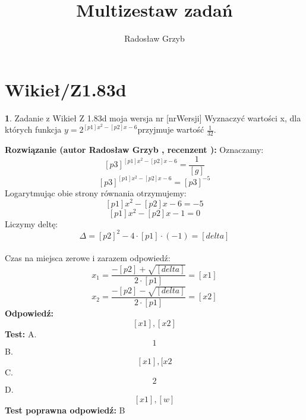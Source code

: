 \documentclass[12pt, a4paper]{article}
\title{Multizestaw zadań}
\author{Radosław Grzyb}
\date{}
\theoremstyle{definition} %
\newtheorem{zad}{}
\newcommand{\kategoria}[1]{\section{#1}} %
\newcommand{\zadStart}[1]{\begin{zad}#1\newline} %
\newcommand{\zadStop}{\end{zad}}   %
\newcommand{\rozwStart}[2]{\noindent \textbf{Rozwiązanie (autor #1 , recenzent #2): }\newline} %
\newcommand{\rozwStop}{\newline}                                            %
\newcommand{\odpStart}{\noindent \textbf{Odpowiedź:}\newline}    %
\newcommand{\odpStop}{\newline}                                             %
\newcommand{\testStart}{\noindent \textbf{Test:}\newline} %
\newcommand{\testStop}{\newline} %
\newcommand{\kluczStart}{\noindent \textbf{Test poprawna odpowiedź:}\newline} %
\newcommand{\kluczStop}{\newline} %
\begin{document}
\maketitle
\kategoria{Wikieł/Z1.83d}
\zadStart{Zadanie z Wikieł Z 1.83d moja wersja nr [nrWersji]}
Wyznaczyć wartości x, dla których funkcja $y=2^{[p1]x^{2}-[p2]x-6}$przyjmuje wartość $\frac{1}{32}$.
\zadStop
\rozwStart{Radosław Grzyb}{}
Oznaczamy:
$$[p3]^{[p1]x^{2}-[p2]x-6}=\frac{1}{[g]}$$
$$[p3]^{[p1]x^{2}-[p2]x-6}=[p3]^{-5}$$
Logarytmując obie strony równania otrzymujemy:\\
$$[p1]x^{2}-[p2]x-6=-5$$
$$[p1]x^{2}-[p2]x-1=0$$
Liczymy deltę:\\
$$\Delta=[p2]^2-4\cdot[p1]\cdot(-1)=[delta]$$\\
Czas na miejsca zerowe i zarazem odpowiedź:
$$x_{1}=\frac{-[p2]+\sqrt{[delta]}}{2\cdot[p1]}=[x1]$$
$$x_{2}=\frac{-[p2]-\sqrt{[delta]}}{2\cdot[p1]}=[x2]$$
\rozwStop
\odpStart
$$[x1],[x2]$$
\odpStop
\testStart
A.$$1$$
B.$$[x1],[x2$$
C.$$2$$
D.$$[x1],[w]$$
\testStop
\kluczStart
B
\kluczStop
\end{document}
